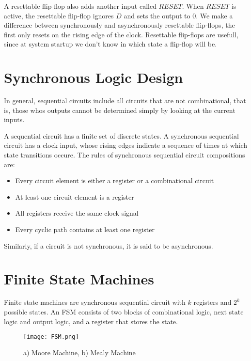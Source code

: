 A resettable flip-flop also adds another input called $RESET$. When $RESET$ is active, the resettable
flip-flop ignores $D$ and sets the output to 0. We make a difference between synchronously and 
asynchronously resettable flip-flops, the first only resets on the rising edge of the clock. Resettable
flip-flops are usefull, since at system startup we don't know in which state a flip-flop will be.

\section{Synchronous Logic Design}

In general, sequential circuits include all circuits that are not combinational, that is, those whos
outputs cannot be determined simply by looking at the current inputs.

A sequential circuit has a finite set of discrete states. A synchronous sequential circuit has a clock
input, whose rising edges indicate a sequence of times at which state transitions occure. The rules
of synchronous sequential circuit compositions are:

\begin{itemize}
    \item Every circuit element is either a register or a combinational circuit
    \item At least one circuit element is a register
    \item All registers receive the same clock signal
    \item Every cyclic path contains at least one register
\end{itemize}

Similarly, if a circuit is not synchronous, it is said to be asynchronous.

\section{Finite State Machines}

Finite state machines are synchronous sequential circuit with $k$ registers and $2^k$ possible states.
An FSM consists of two blocks of combinational logic, next state logic and output logic, and a register
that stores the state.

\begin{figure}[h]
    \centering
    \texttt{[image: FSM.png]}
    \caption{a) Moore Machine, b) Mealy Machine}
\end{figure}

